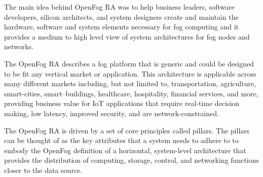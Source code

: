 \documentclass{article}
\begin{document}
The main idea behind OpenFog RA was to help business leaders, software developers, silicon architects, and system designers create and maintain the hardware, software and system elements necessary for fog computing and it provides a medium to high level view of system architectures for fog nodes and networks\cite{openfogconsortium2017}.

The OpenFog RA describes a fog platform that is generic and could be designed to be fit any vertical market or application. 
This architecture is applicable across many different markets including, but not limited to, transportation, agriculture, smart-cities, smart–buildings, healthcare, hospitality, financial services, and more, providing business value for IoT applications that require real-time decision making, low latency, improved security, and are network-constrained\cite{openfogconsortium2017}.

The OpenFog RA is driven by a set of core principles called pillars\cite{openfogconsortium2017}.
The pillars can be thought of as the key attributes that a system needs to adhere to to embody the OpenFog definition of a horizontal, system-level architecture that provides the distribution of computing, storage, control, and networking functions closer to the data source\cite{openfogconsortium2017}.
\end{document}
